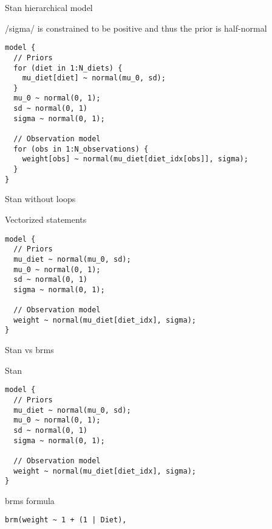 \documentclass[finnish,english,t]{beamer}
\begin{document}
\begin{frame}[fragile]{Stan hierarchical model}

  \vspace{-0.5\baselineskip}

\rinline/sigma/ is constrained to be positive and thus the prior is half-normal
  
\vspace{-0.5\baselineskip}
{\small
\begin{verbatim}
model {
  // Priors
  for (diet in 1:N_diets) {
    mu_diet[diet] ~ normal(mu_0, sd);
  }
  mu_0 ~ normal(0, 1);
  sd ~ normal(0, 1)
  sigma ~ normal(0, 1);
  
  // Observation model
  for (obs in 1:N_observations) {
    weight[obs] ~ normal(mu_diet[diet_idx[obs]], sigma);
  }
}
\end{verbatim}
}
\end{frame}

\begin{frame}[fragile]{Stan without loops}

  \vspace{-0.5\baselineskip}

  Vectorized statements
  
\vspace{-0.5\baselineskip}
{\small
\begin{verbatim}
model {
  // Priors
  mu_diet ~ normal(mu_0, sd);
  mu_0 ~ normal(0, 1);
  sd ~ normal(0, 1)
  sigma ~ normal(0, 1);
  
  // Observation model
  weight ~ normal(mu_diet[diet_idx], sigma);
}
\end{verbatim}
}

\end{frame}

\begin{frame}[fragile]{Stan vs brms}

  \vspace{-0.5\baselineskip}

  Stan 
  
\vspace{-0.5\baselineskip}
{\small
\begin{verbatim}
model {
  // Priors
  mu_diet ~ normal(mu_0, sd);
  mu_0 ~ normal(0, 1);
  sd ~ normal(0, 1)
  sigma ~ normal(0, 1);
  
  // Observation model
  weight ~ normal(mu_diet[diet_idx], sigma);
}
\end{verbatim}

\vspace{-\baselineskip}
{\color{lightgray}\hrulefill}

  brms formula
  \vspace{-0.5\baselineskip}
\begin{verbatim}  
brm(weight ~ 1 + (1 | Diet),
\end{verbatim}
}

\end{frame}
\end{document}
